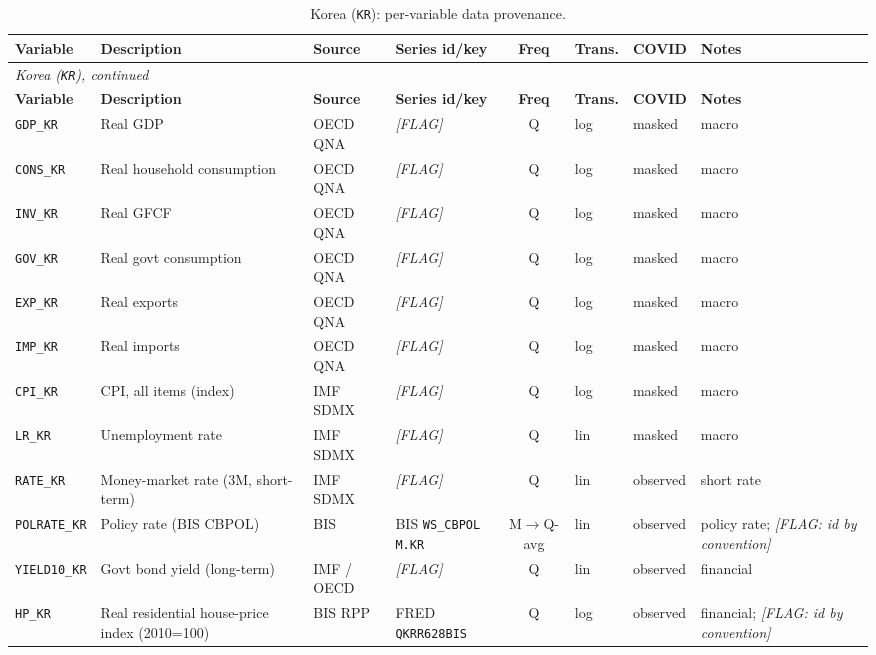 {\small
\begin{longtable}{@{}lp{2.9cm}p{1.9cm}p{2.0cm}cp{1.4cm}p{1.7cm}p{2.6cm}@{}}
\caption{Korea (\texttt{KR}): per-variable data provenance.}\label{tab:data:KR}\\
\toprule
\textbf{Variable} & \textbf{Description} & \textbf{Source} & \textbf{Series id/key} & \textbf{Freq} & \textbf{Trans.} & \textbf{COVID} & \textbf{Notes}\\
\midrule
\endfirsthead
\multicolumn{8}{l}{\small\itshape Korea (\texttt{KR}), continued}\\
\toprule
\textbf{Variable} & \textbf{Description} & \textbf{Source} & \textbf{Series id/key} & \textbf{Freq} & \textbf{Trans.} & \textbf{COVID} & \textbf{Notes}\\
\midrule
\endhead
\bottomrule
\endfoot
\texttt{GDP\_KR} & Real GDP & OECD QNA & \textit{[FLAG]} & Q & log & masked & macro\\
\texttt{CONS\_KR} & Real household consumption & OECD QNA & \textit{[FLAG]} & Q & log & masked & macro\\
\texttt{INV\_KR} & Real GFCF & OECD QNA & \textit{[FLAG]} & Q & log & masked & macro\\
\texttt{GOV\_KR} & Real govt consumption & OECD QNA & \textit{[FLAG]} & Q & log & masked & macro\\
\texttt{EXP\_KR} & Real exports & OECD QNA & \textit{[FLAG]} & Q & log & masked & macro\\
\texttt{IMP\_KR} & Real imports & OECD QNA & \textit{[FLAG]} & Q & log & masked & macro\\
\texttt{CPI\_KR} & CPI, all items (index) & IMF SDMX & \textit{[FLAG]} & Q & log & masked & macro\\
\texttt{LR\_KR} & Unemployment rate & IMF SDMX & \textit{[FLAG]} & Q & lin & masked & macro\\
\texttt{RATE\_KR} & Money-market rate (3M, short-term) & IMF SDMX & \textit{[FLAG]} & Q & lin & observed & short rate\\
\texttt{POLRATE\_KR} & Policy rate (BIS CBPOL) & BIS & BIS \texttt{WS\_CBPOL} \texttt{M.KR} & M$\to$Q-avg & lin & observed & policy rate; \textit{[FLAG: id by convention]}\\
\texttt{YIELD10\_KR} & Govt bond yield (long-term) & IMF / OECD & \textit{[FLAG]} & Q & lin & observed & financial\\
\texttt{HP\_KR} & Real residential house-price index (2010=100) & BIS RPP & FRED \texttt{QKRR628BIS} & Q & log & observed & financial; \textit{[FLAG: id by convention]}\\

\end{longtable}}
